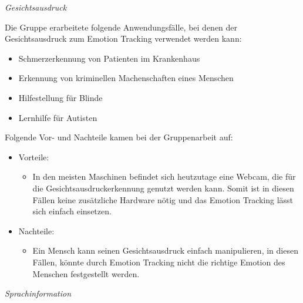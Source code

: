 \vspace{2mm}
\textit{Gesichtsausdruck} \newline 

Die Gruppe erarbeitete folgende Anwendungsfälle, bei denen der Gesichtsausdruck zum Emotion Tracking verwendet werden kann:
\begin{itemize}
	\item Schmerzerkennung von Patienten im Krankenhaus
	\item Erkennung von kriminellen Machenschaften eines Menschen
	\item Hilfestellung für Blinde
	\item Lernhilfe für Autisten
\end{itemize}
Folgende Vor- und Nachteile kamen bei der Gruppenarbeit auf:
\begin{itemize}
	\item Vorteile:
	\begin{itemize}
		\item In den meisten Maschinen befindet sich heutzutage eine Webcam, die für die Gesichtsausdruckerkennung genutzt werden kann. Somit ist in diesen Fällen keine zusätzliche Hardware nötig und das Emotion Tracking lässt sich einfach einsetzen.		 
	\end{itemize}
	\item Nachteile:
	\begin{itemize}
		\item Ein Mensch kann seinen Gesichtsausdruck einfach manipulieren, in diesen Fällen, könnte durch Emotion Tracking nicht die richtige Emotion des Menschen festgestellt werden.
	\end{itemize}
\end{itemize}

\vspace{2mm}
\textit{Sprachinformation} \newline

